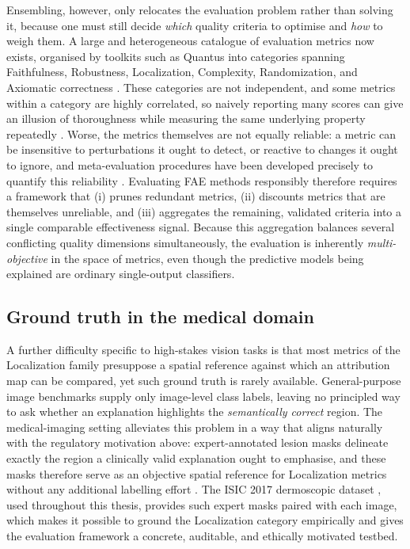 Ensembling, however, only relocates the evaluation problem rather than solving
it, because one must still decide \emph{which} quality criteria to optimise and
\emph{how} to weigh them. A large and heterogeneous catalogue of evaluation
metrics now exists, organised by toolkits such as Quantus into categories
spanning Faithfulness, Robustness, Localization, Complexity, Randomization, and
Axiomatic correctness \cite{hedstrom2023quantus, paccotacya2024explanations}.
These categories are not independent, and some metrics within a category are
highly correlated, so naively reporting many scores can give an illusion of
thoroughness while measuring the same underlying property repeatedly
\cite{bommer2024finding}. Worse, the metrics themselves are not equally
reliable: a metric can be insensitive to perturbations it ought to detect, or
reactive to changes it ought to ignore, and meta-evaluation procedures have been
developed precisely to quantify this reliability \cite{hedstrom2024metaquantus,
tomsett2020sanity}. Evaluating FAE methods responsibly therefore requires a
framework that (i) prunes redundant metrics, (ii) discounts metrics that are
themselves unreliable, and (iii) aggregates the remaining, validated criteria
into a single comparable effectiveness signal. Because this aggregation balances
several conflicting quality dimensions simultaneously, the evaluation is
inherently \emph{multi-objective} in the space of metrics, even though the
predictive models being explained are ordinary single-output classifiers.

\subsection{Ground truth in the medical domain}

A further difficulty specific to high-stakes vision tasks is that most metrics
of the Localization family presuppose a spatial reference against which an
attribution map can be compared, yet such ground truth is rarely available.
General-purpose image benchmarks supply only image-level class labels, leaving
no principled way to ask whether an explanation highlights the
\emph{semantically correct} region. The medical-imaging setting alleviates this
problem in a way that aligns naturally with the regulatory motivation above:
expert-annotated lesion masks delineate exactly the region a clinically valid
explanation ought to emphasise, and these masks therefore serve as an objective
spatial reference for Localization metrics without any additional labelling
effort \cite{sangwan2024quantifying}. The ISIC 2017 dermoscopic dataset
\cite{codella2018isic}, used
throughout this thesis, provides such expert masks paired with each image, which
makes it possible to ground the Localization category empirically and gives the
evaluation framework a concrete, auditable, and ethically motivated testbed.

